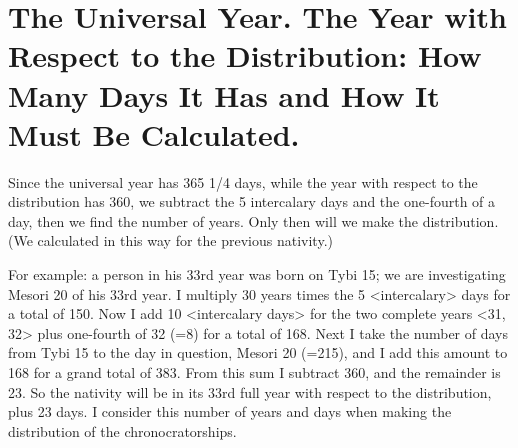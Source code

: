 \section{The Universal Year. The Year with Respect to the Distribution: How Many Days It Has and How It Must Be Calculated.}

Since the universal year has 365 1/4 days, while the year with respect to the distribution has 360, we subtract the 5 intercalary days and the one-fourth of a day, then we find the number of years. Only then will we make the distribution. (We calculated in this way for the previous nativity.) 

For example: a person in his 33rd year was born on Tybi 15; we are investigating Mesori 20 of his 33rd year. I multiply 30 years
times the 5 <intercalary> days for a total of 150. Now I add 10 <intercalary days> for the two complete years <31, 32> plus one-fourth of 32 (=8) for a total of 168. Next I take the number of days from Tybi 15 to the day in question, Mesori 20 (=215), and I add this amount to 168 for a grand total of 383. From this sum I subtract 360, and the remainder is 23. So the nativity will be in its 33rd full year with respect to the distribution, plus 23 days. I consider this number of years and days when making the distribution of the chronocratorships.

\newpage